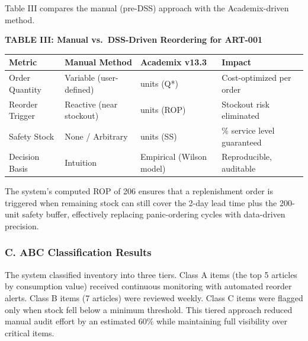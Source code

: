 ﻿\documentclass[conference]{IEEEtran}
\begin{document}
Table III compares the manual (pre-DSS) approach with the
Academix-driven method.

\textbf{TABLE III: Manual vs.~DSS-Driven Reordering for ART-001}

{\def\LTcaptype{none} %
\begin{longtable}[]{@{}
  >{\raggedright\arraybackslash}p{}
  >{\raggedright\arraybackslash}p{}
  >{\raggedright\arraybackslash}p{}
  >{\raggedright\arraybackslash}p{}@{}}
\toprule\noalign{}
\begin{minipage}[b]{\linewidth}\raggedright
Metric
\end{minipage} & \begin{minipage}[b]{\linewidth}\raggedright
Manual Method
\end{minipage} & \begin{minipage}[b]{\linewidth}\raggedright
Academix v13.3
\end{minipage} & \begin{minipage}[b]{\linewidth}\raggedright
Impact
\end{minipage} \\
\midrule\noalign{}
\endhead
\bottomrule\noalign{}
\endlastfoot
Order Quantity & Variable (user-defined) & 37 units (Q*) &
Cost-optimized per order \\
Reorder Trigger & Reactive (near stockout) & 206 units (ROP) & Stockout
risk eliminated \\
Safety Stock & None / Arbitrary & 200 units (SS) & 99.7\% service level
guaranteed \\
Decision Basis & Intuition & Empirical (Wilson model) & Reproducible,
auditable \\
\end{longtable}
}

The system's computed ROP of 206 ensures that a replenishment order is
triggered when remaining stock can still cover the 2-day lead time plus
the 200-unit safety buffer, effectively replacing panic-ordering cycles
with data-driven precision.

\subsubsection{C. ABC Classification
Results}\label{c.-abc-classification-results}

The system classified inventory into three tiers. Class A items (the top
5 articles by consumption value) received continuous monitoring with
automated reorder alerts. Class B items (7 articles) were reviewed
weekly. Class C items were flagged only when stock fell below a minimum
threshold. This tiered approach reduced manual audit effort by an
estimated 60\% while maintaining full visibility over critical items.
\end{document}
